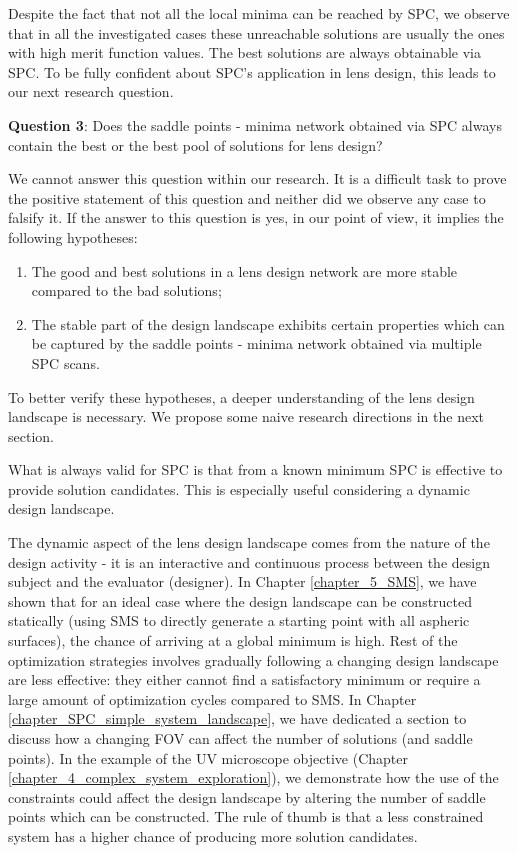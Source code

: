 Despite the fact that not all the local minima can be reached by SPC, we observe that in all the investigated cases these unreachable solutions are usually the ones with high merit function values. The best solutions are always obtainable via SPC. To be fully confident about SPC's application in lens design, this leads to our next research question.

\vspace{1em}

\textbf{Question 3}: Does the saddle points - minima network obtained via SPC always contain the best or the best pool of solutions for lens design? 

We cannot answer this question within our research. It is a difficult task to prove the positive statement of this question and neither did we observe any case to falsify it. If the answer to this question is yes, in our point of view, it implies the following hypotheses:

\begin{enumerate}[nosep]
\item The good and best solutions in a lens design network are more stable compared to the bad solutions;
\item The stable part of the design landscape exhibits certain properties which can be captured by the saddle points - minima network obtained via multiple SPC scans.
\end{enumerate}


To better verify these hypotheses, a deeper understanding of the lens design landscape is necessary. We propose some naive research directions in the next section. 

\vspace{1em}

What is always valid for SPC is that from a known minimum SPC is effective to provide solution candidates. This is especially useful considering a dynamic design landscape. 

The dynamic aspect of the lens design landscape comes from the nature of the design activity - it is an interactive and continuous process between the design subject and the evaluator (designer). In Chapter \ref{chapter_5_SMS}, we have shown that for an ideal case where the design landscape can be constructed statically (using SMS to directly generate a starting point with all aspheric surfaces), the chance of arriving at a global minimum is high. Rest of the optimization strategies involves gradually following a changing design landscape are less effective: they either cannot find a satisfactory minimum or require a large amount of optimization cycles compared to SMS. In Chapter \ref{chapter_SPC_simple_system_landscape}, we have dedicated a section to discuss how a changing FOV can affect the number of solutions (and saddle points). In the example of the UV microscope objective (Chapter \ref{chapter_4_complex_system_exploration}), we demonstrate how the use of the constraints could affect the design landscape by altering the number of saddle points which can be constructed. The rule of thumb is that a less constrained system has a higher chance of producing more solution candidates. 


